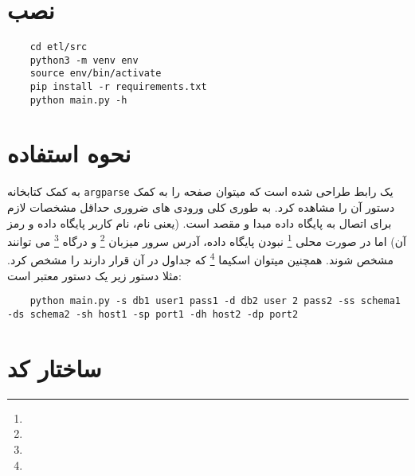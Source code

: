 \documentclass{article}
\title{\textbf{\homework}}
\author{\meAndStudentNumber}
\date{}
\begin{document}
\maketitle

\doublespacing

\section*{نصب}

\begin{latin}
\begin{lstlisting}
	cd etl/src
	python3 -m venv env
	source env/bin/activate
	pip install -r requirements.txt
	python main.py -h
\end{lstlisting}
\end{latin}

\section*{نحوه استفاده}

به کمک کتابخانه 
\lstinline|argparse|
یک رابط 
طراحی شده است که میتوان صفحه 
را به کمک دستور
آن را مشاهده کرد. به طوری کلی ورودی های ضروری حداقل مشخصات لازم برای اتصال به پایگاه داده مبدا و مقصد است. (یعنی نام، نام کاربر پایگاه داده و رمز آن) اما در صورت محلی
\footnote{}
نبودن پایگاه داده، آدرس سرور میزبان
\footnote{}
و درگاه 
\footnote{}
می توانند مشخص شوند. همچنین میتوان اسکیما 
\footnote{}
که جداول در آن قرار دارند را مشخص کرد.  مثلا دستور زیر یک دستور معتبر است:
\begin{latin}
\begin{lstlisting}
	python main.py -s db1 user1 pass1 -d db2 user 2 pass2 -ss schema1 -ds schema2 -sh host1 -sp port1 -dh host2 -dp port2
\end{lstlisting}
\end{latin}

\section*{ساختار کد}
\end{document}
